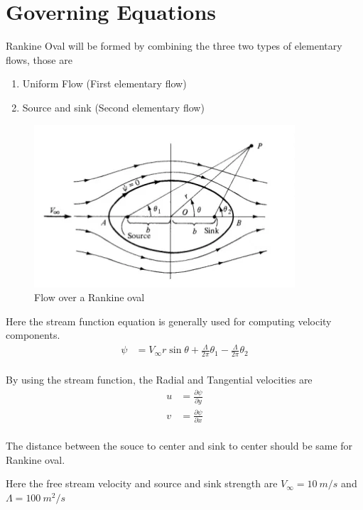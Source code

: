 \documentclass[conf]{new-aiaa}
\begin{document}
\section{Governing Equations}
\par Rankine Oval will be formed by combining the three two types of elementary flows, those are
\begin{enumerate}
	\item Uniform Flow (First elementary flow)
	\item Source and sink (Second elementary flow)
\end{enumerate}
\begin{figure}[!h]
    \center
    \includegraphics[scale=0.8]{images/oval.png}
    \caption{Flow over a Rankine oval}
    \label{fig01}
\end{figure}
\par Here the stream function equation is generally used for computing velocity components.\\
\begin{align*}
	\psi & = V_\infty r \sin{\theta} + \frac{\Lambda}{2 \pi} \theta_1 -\frac{\Lambda}{2 \pi} \theta_2\\
\end{align*}
\par By using the stream function, the Radial and Tangential velocities are\\
\begin{align*}
	u & = \frac{\partial \psi}{\partial y} \\
	v & = \frac{\partial \psi}{\partial x} \\
\end{align*}
\par The distance  between the souce to center and  sink to center should be same for Rankine oval. \\
\par Here the free stream velocity and source and sink strength are $V_\infty = 10 \ m/s$ and $\Lambda = 100 \ m^2/s $
\end{document}

